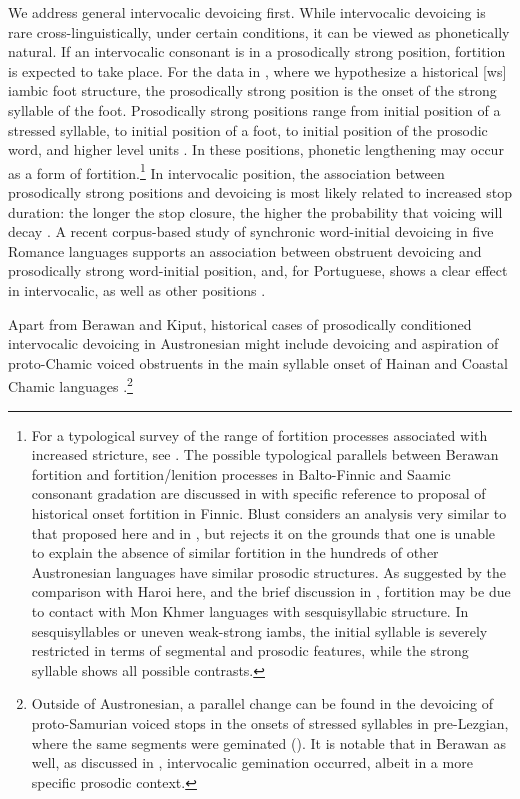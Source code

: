 \documentclass[output=paper]{langscibook}
\begin{document}
We address general intervocalic devoicing first. While intervocalic devoicing is rare cross-linguistically, under certain conditions, it can be viewed as phonetically natural. If an intervocalic consonant is in a prosodically strong position, fortition is expected to take place. For the data in , where we hypothesize a historical [ws] iambic foot structure, the prosodically strong position is the onset of the strong syllable of the foot. Prosodically strong positions range from initial position of a stressed syllable, to initial position of a foot, to initial position of the prosodic word, and higher level units \citep[155]{Gordon2016}. In these positions, phonetic lengthening may occur as a form of fortition.\footnote{For a typological survey of the range of fortition processes associated with increased stricture, see \citet{BybeeEasterday2019}.  The possible typological parallels between Berawan fortition and fortition/lenition processes in Balto-Finnic and Saamic consonant gradation are discussed in \citet{Blust2018} with specific reference to  proposal of historical onset fortition in Finnic. Blust considers an analysis very similar to that proposed here and in , but rejects it on the grounds that one is unable to explain the absence of similar fortition in the hundreds of other Austronesian languages have similar prosodic structures. As suggested by the comparison with Haroi here, and the brief discussion in , fortition may be due to contact with Mon Khmer languages with sesquisyllabic structure. In sesquisyllables or uneven weak-strong iambs, the initial syllable is severely restricted in terms of segmental and prosodic features, while the strong syllable shows all possible contrasts.} In intervocalic position, the association between prosodically strong positions and devoicing is most likely related to increased stop duration: the longer the stop closure, the higher the probability that voicing will decay \citep{Ohala2003}. A recent corpus-based study of synchronic word-initial devoicing in five Romance languages supports an association between obstruent devoicing and prosodically strong word-initial position, and, for Portuguese, shows a clear effect in intervocalic, as well as other positions \citep{HutinEtAl2021}.

Apart from Berawan and Kiput, historical cases of prosodically conditioned intervocalic devoicing in Austronesian might include devoicing and aspiration of proto-Chamic voiced obstruents in the main syllable onset of Hainan and Coastal Chamic languages \citep[82]{Thurgood1999}.\footnote{Outside of Austronesian, a parallel change can be found in the devoicing of proto-Samurian voiced stops in the onsets of stressed syllables in pre-Lezgian, where the same segments were geminated (\citealt{Topuria1974, Yu2004}). It is notable that in Berawan as well, as discussed in , intervocalic gemination occurred, albeit in a more specific prosodic context.} 
\end{document}
